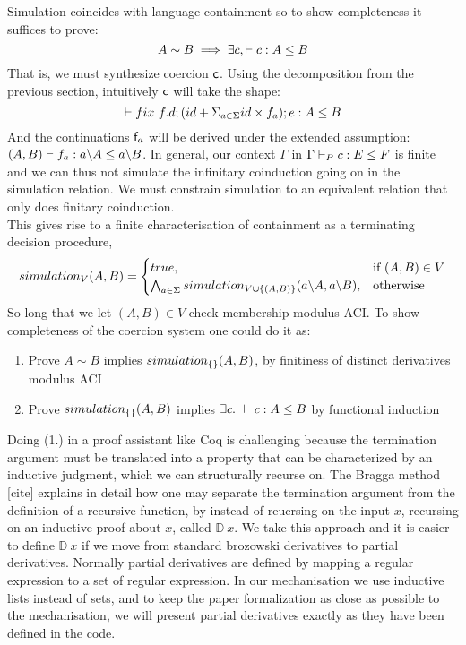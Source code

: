 \documentclass[a4paper,UKenglish,cleveref, autoref, thm-restate]{lipics-v2021}
\begin{document}
Simulation coincides with language containment so to show completeness it suffices to prove:
\[ A \sim B \implies \exists c, \contains{}{c}{A}{B} \]
That is, we must synthesize coercion $\textsf{c}$. Using the decomposition from the previous section, intuitively $\textsf{c}$ will take the shape:
\[\contains{}{\fix ~f.d;(id + \Sigma_{a \in \Sigma} id\times f_a); e}{A}{B}\]
And the continuations $\textsf{f}_a$ will be derived under the extended assumption: $\contains{(A,B)}{f_a}{\derive{a}{A}}{\derive{a}{B}}$. In general, our context $\Gamma$ in $\containsG{c}{E}{F}$ is finite and we can thus not simulate the infinitary coinduction going on in the simulation relation. We must constrain simulation to an equivalent relation that only does finitary coinduction.\\
This gives rise to a finite characterisation of containment as a terminating decision procedure,
\begin{align}
\simulationb{V}{A}{B} =\begin{cases}
			\true, & \text{if }(A,B) \in V\\
                      \bigwedge_{a \in \Sigma}\simulationb{V \cup \{(A,B)\}}{\derive{a}{A}}{\derive{a}{B}}, & \text{otherwise}
		 \end{cases}
\end{align}
So long that we let $(A,B) \in V$ check membership modulus ACI. To show completeness of the coercion system one could do it as:
\begin{enumerate}
\item Prove $A \sim B$ implies $\simulationb{\{\}}{A}{B}$, by finitiness of distinct derivatives modulus ACI
\item Prove $\simulationb{\{\}}{A}{B}$ implies $\exists c.~\contains{}{c}{A}{B}$ by functional induction
\end{enumerate}
Doing (1.) in a proof assistant like Coq is challenging because the termination argument must be translated into a property that can be characterized by an inductive judgment, which we can structurally recurse on. The Bragga method [cite] explains in detail how one may separate the termination argument from the definition of a recursive function, by instead of reucrsing on the input $x$, recursing on an inductive proof about $x$, called $\mathbb{D}~x$. We take this approach and it is easier to define $\mathbb{D}~x$ if we move from standard brozowski derivatives to partial derivatives. Normally partial derivatives are defined by mapping a regular expression to a set of regular expression. In our mechanisation we use inductive lists instead of sets, and to keep the paper formalization as close as possible to the mechanisation, we will present partial derivatives exactly as they have been defined in the code.\\
\end{document}
